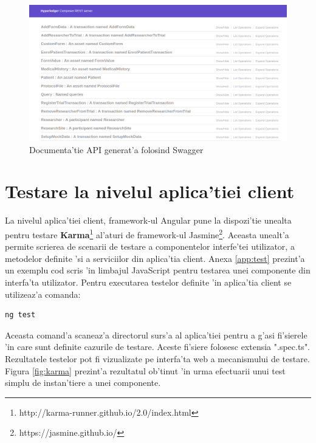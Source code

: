 \documentclass[12pt,a4paper,twoside]{report}
\begin{document}
             \begin{figure}[H]
		\begin{center}
			\includegraphics[scale=0.35]{img/swagger.png}
			\caption{Documenta'tie API generat'a folosind Swagger}
  			\label{fig:swagger}
  		\end{center}
  		\end{figure}
  		
  	\section{Testare la nivelul aplica'tiei client}
  	La nivelul aplica'tiei client, framework-ul Angular pune la dispozi'tie unealta pentru testare \textbf{Karma}\footnote{http://karma-runner.github.io/2.0/index.html} al'aturi de framework-ul Jasmine\footnote{https://jasmine.github.io/}. Aceasta unealt'a permite scrierea de scenarii de testare a componentelor interfe'tei utilizator, a metodelor definite 'si a serviciilor din aplica'tia client. Anexa \ref{app:test} prezint'a un exemplu cod scris 'in limbajul JavaScript pentru testarea unei componente din interfa'ta utilizator. Pentru executarea testelor definite 'in aplica'tia client se utilizeaz'a comanda:
  	\begin{lstlisting}[backgroundcolor=\color{light-gray}]
    ng test
    \end{lstlisting}
    Aceasta comand'a scaneaz'a directorul surs'a al aplica'tiei pentru a g'asi fi'sierele 'in care sunt definite cazurile de testare. Aceste fi'siere folosesc extensia ".spec.ts". Rezultatele testelor pot fi vizualizate pe interfa'ta web a mecanismului de testare. Figura \ref{fig:karma} prezint'a rezultatul ob'tinut 'in urma efectuarii unui test simplu de instan'tiere a unei componente.
    
\end{document}
